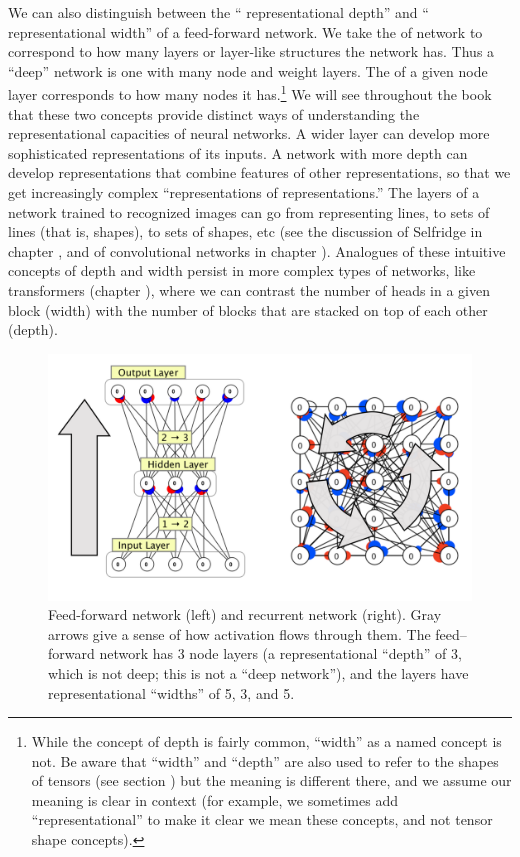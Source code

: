 We can also distinguish between the `` representational depth'' and `` representational width'' of a feed-forward network.  We take the  of network to correspond to how many layers or layer-like structures the network has. Thus a ``deep'' network is one with many node and weight layers. The  of a given node layer corresponds to how many nodes it has.\footnote{While the concept of depth is fairly common, ``width'' as a named concept is not. Be aware that ``width'' and ``depth'' are also used to refer to the shapes of tensors (see section ) but the meaning is different there, and we assume our meaning is clear in context (for example, we sometimes add ``representational'' to make it clear we mean these concepts, and not tensor shape concepts).} We will see throughout the book that these two concepts provide distinct ways of understanding the representational capacities of neural networks. A wider layer can develop more sophisticated representations of its inputs. A network with more depth can develop representations that combine features of other representations, so that we get increasingly complex ``representations of representations.'' The layers of a network trained to recognized images can go from representing lines, to sets of lines (that is, shapes), to sets of shapes, etc (see the discussion of Selfridge in chapter , and of convolutional networks in chapter ). Analogues of these intuitive concepts of depth and width persist in more complex types of networks, like transformers (chapter ), where we can contrast the number of heads in a given block (width) with the number of blocks that are stacked on top of each other (depth). 
 
\begin{figure}[h]
\centering
\includegraphics[scale=.7]{./images/NeuralNetTypes.png}
\caption[Simbrain screenshots with additional elements added by Pamela Payne.]{Feed-forward network (left) and recurrent network (right). Gray arrows give a sense of how activation flows through them. The feed--forward network has 3 node layers (a representational ``depth'' of 3, which is not deep; this is not a ``deep network''), and the layers have representational ``widths'' of 5, 3, and 5. }
\label{nn_types}
\end{figure}


